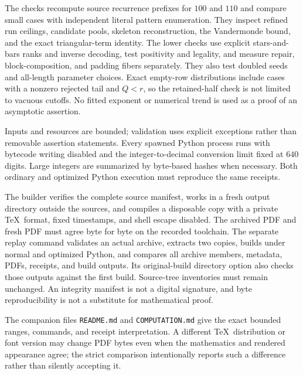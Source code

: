 \documentclass[11pt,letterpaper]{article}
\theoremstyle{remark}\newtheorem{remark}[theorem]{Remark}
\theoremstyle{remark}\newtheorem{wremark}{Remark}\renewcommand{\thewremark}{W\arabic{wremark}}
\theoremstyle{plain}\newtheorem{wcorollary}[wremark]{Corollary}
\begin{document}
The checks recompute source recurrence prefixes for $100$ and $110$ and compare small cases with independent literal pattern enumeration. They inspect refined run ceilings, candidate pools, skeleton reconstruction, the Vandermonde bound, and the exact triangular-term identity. The lower checks use explicit stars-and-bars ranks and inverse decoding, test positivity and legality, and measure repair, block-composition, and padding fibers separately. They also test doubled seeds and all-length parameter choices. Exact empty-row distributions include cases with a nonzero rejected tail and $Q<r$, so the retained-half check is not limited to vacuous cutoffs. No fitted exponent or numerical trend is used as a proof of an asymptotic assertion.

Inputs and resources are bounded; validation uses explicit exceptions rather than removable assertion statements. Every spawned Python process runs with bytecode writing disabled and the integer-to-decimal conversion limit fixed at $640$ digits. Large integers are summarized by byte-based hashes when necessary. Both ordinary and optimized Python execution must reproduce the same receipts.

The builder verifies the complete source manifest, works in a fresh output directory outside the sources, and compiles a disposable copy with a private \TeX\ format, fixed timestamps, and shell escape disabled. The archived PDF and fresh PDF must agree byte for byte on the recorded toolchain. The separate replay command validates an actual archive, extracts two copies, builds under normal and optimized Python, and compares all archive members, metadata, PDFs, receipts, and build outputs. Its original-build directory option also checks those outputs against the first build. Source-tree inventories must remain unchanged. An integrity manifest is not a digital signature, and byte reproducibility is not a substitute for mathematical proof.

The companion files \texttt{README.md} and \texttt{COMPUTATION.md} give the exact bounded ranges, commands, and receipt interpretation. A different \TeX\ distribution or font version may change PDF bytes even when the mathematics and rendered appearance agree; the strict comparison intentionally reports such a difference rather than silently accepting it.
\end{document}
